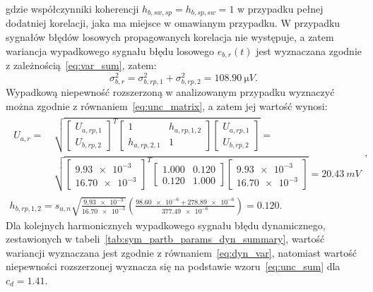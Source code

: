gdzie współczynniki koherencji $h_{b,sw,sp} = h_{b,sp,sw} = 1$ w przypadku pełnej dodatniej korelacji, jaka ma miejsce w omawianym przypadku. W przypadku sygnałów błędów losowych propagowanych korelacja nie występuje, a zatem wariancja wypadkowego sygnału błędu losowego $e_{b,r}(t)$ jest wyznaczana zgodnie z zależnością~\eqref{eq:var_sum}, zatem:
\begin{equation}
\sigma_{b,r}^{2} = \sigma_{b,rp,1}^{2} + \sigma_{b,rp,2}^{2} = \qty{108.90}{\micro V} \label{eq:sym_partb_rand_var}.
\end{equation}
Wypadkową niepewność rozszerzoną w analizowanym przypadku wyznaczyć można zgodnie z równaniem~\eqref{eq:unc_matrix}, a zatem jej wartość wynosi:
\begin{gather}
\begin{split}
U_{a,r} = ~ & \sqrt{
\begin{bmatrix}
U_{a,rp,1} \\ U_{b,rp,2}
\end{bmatrix}^{T}
\begin{bmatrix}
1            & h_{a,rp,1,2} \\
h_{a,rp,2,1} & 1
\end{bmatrix}
\begin{bmatrix}
U_{a,rp,1} \\ U_{b,rp,2}
\end{bmatrix}} = ~ \\ & \sqrt{
\begin{bmatrix}
\num{9.93e-3} \\ \num{16.70e-3}
\end{bmatrix}^{T}
\begin{bmatrix}
\num{1.000} & \num{0.120} \\
\num{0.120} & \num{1.000}
\end{bmatrix}
\begin{bmatrix}
\num{9.93e-3} \\ \num{16.70e-3}
\end{bmatrix}} = \qty{20.43}{mV}
\end{split}
\label{eq:sym_partb_rand_uncert}, \\
h_{b,rp,1,2} = s_{u,n} \sqrt{\frac{\num{9.93e-3}}{\num{16.70e-3}}} \left( \frac{\num{98.60e-6} + \num{278.89e-6}}{\num{377.49e-6}} \right) = \num{0.120} \label{eq:sym_partb_coher_rp_1_2}.
\end{gather}
Dla kolejnych harmonicznych wypadkowego sygnału błędu dynamicznego, zestawionych w tabeli~\ref{tab:sym_partb_params_dyn_summary}, wartość wariancji wyznaczana jest zgodnie z równaniem~\eqref{eq:dyn_var}, natomiast wartość niepewności rozszerzonej wyznacza się na podstawie wzoru~\eqref{eq:unc_sum} dla $c_{d} = \num{1.41}$.

